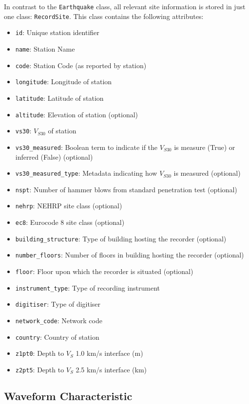 In contrast to the \verb=Earthquake= class, all relevant site information is stored in just one class: \verb=RecordSite=. This class contains the following attributes:
\begin{itemize}
\item \verb=id=: Unique station identifier
\item \verb=name=: Station Name
\item \verb=code=: Station Code (as reported by station)
\item \verb=longitude=: Longitude of station
\item \verb=latitude=: Latitude of station
\item \verb=altitude=: Elevation of station (optional)
\item \verb=vs30=: $V_{S30}$ of station
\item \verb=vs30_measured=: Boolean term to indicate if the $V_{S30}$ is measure (True) or inferred (False) (optional)
\item \verb=vs30_measured_type=: Metadata indicating how $V_{S30}$ is measured (optional)
\item \verb=nspt=: Number of hammer blows from standard penetration test (optional)
\item \verb=nehrp=: NEHRP site class (optional)
\item \verb=ec8=: Eurocode 8 site class (optional)
\item \verb=building_structure=: Type of building hosting the recorder (optional)
\item \verb=number_floors=: Number of floors in building hosting the recorder (optional)
\item \verb=floor=: Floor upon which the recorder is situated (optional)
\item \verb=instrument_type=: Type of recording instrument
\item \verb=digitiser=: Type of digitiser
\item \verb=network_code=: Network code
\item \verb=country=: Country of station
\item \verb=z1pt0=: Depth to $V_S$ 1.0 km/s interface (m)
\item \verb=z2pt5=: Depth to $V_S$ 2.5 km/s interface (km)
\end{itemize}

\subsection{Waveform Characteristic}

